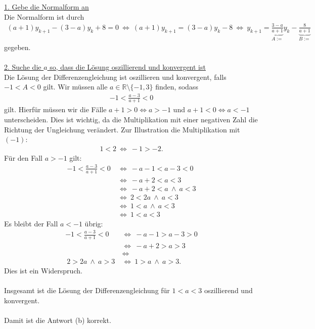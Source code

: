 \underline{1. Gebe die Normalform an}\\
Die Normalform ist durch
\begin{align*}
(a+1) y_{k+1} - (3-a) y_k + 8 = 0
\ \Leftrightarrow \
(a+1) y_{k+1} = (3-a) y_k - 8
\ \Leftrightarrow \
y_{k+1} = \underbrace{\frac{3-a }{a+ 1}}_{A:=} y_k - \underbrace{\frac{8}{a+1}}_{B:=}
\end{align*}
gegeben.\\
\\
\underline{2. Suche die $ a $ so, dass die Lösung oszillierend und konvergent ist}\\
Die Lösung der Differenzengleichung ist oszillieren und konvergent, falls $ -1 < A < 0 $ gilt.
Wir müssen alle $ a \in \mathbb{R} \setminus \{-1,3\} $ finden, sodass
\begin{align*}
-1 < \frac{a-3}{a+1} < 0
\end{align*}
gilt. 
Hierfür müssen wir die Fälle $ a+1 > 0  \Leftrightarrow a > -1 $ und $ a+1 < 0 \Leftrightarrow a < -1 $ unterscheiden.
Dies ist wichtig, da die Multiplikation mit einer negativen Zahl die Richtung der Ungleichung verändert.
Zur Illustration die Multiplikation mit $ (-1) $:
\begin{align*}
1 < 2 \ \Leftrightarrow \ -1 > -2.
\end{align*}
Für den Fall $ a > -1 $ gilt:
\begin{align*}
-1 < \frac{a-3}{a+1} < 0 
&\ \Leftrightarrow \
-a - 1 < a - 3  < 0\\
&\ \Leftrightarrow \
-a + 2 < a < 3 \\
&\ \Leftrightarrow \
-a + 2 < a \ \wedge \ a < 3\\
&\ \Leftrightarrow \
 2 <  2 a \ \wedge \ a < 3\\
&\ \Leftrightarrow \
1 <   a \ \wedge \ a < 3 \\
&\ \Leftrightarrow \
1 <   a < 3 
\end{align*}
Es bleibt der Fall $ a <  -1  $ übrig:
\begin{align*}
-1 < \frac{a-3}{a+1} < 0 
&\ \Leftrightarrow \
-a - 1 > a - 3  > 0\\
&\ \Leftrightarrow \
-a + 2 > a   > 3\\
&\ \Leftrightarrow \\\
2 > 2 a  \ \wedge \ a   > 3
&\ \Leftrightarrow \
1  > a  \ \wedge \ a   > 3.
\end{align*}
Dies ist ein Widerspruch.\\
\\
Insgesamt ist die Lösung der Differenzengleichung für $ 1 < a < 3 $ oszillierend und konvergent.\\
\\
Damit ist die Antwort (b) korrekt.

